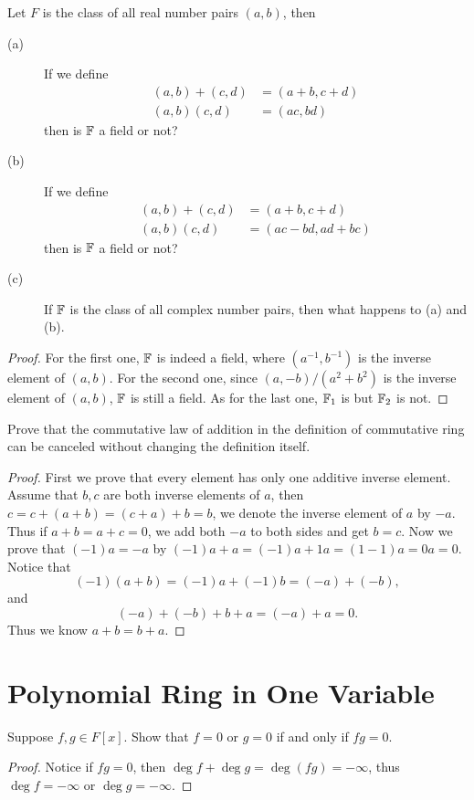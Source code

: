 \begin{pro}%
	Let $F$ is the class of all real number pairs $(a,b)$, then 
	\begin{description}
	\item[(a)] If we define 
		\begin{align*}
		(a,b)+(c,d)&=(a+b,c+d)\\
		(a,b)(c,d)&=(ac,bd)
		\end{align*}
		then is $\mathbb{F}$ a field or not?
	\item[(b)] If we define
		\begin{align*}
		(a,b)+(c,d)&=(a+b,c+d)\\
		(a,b)(c,d)&=(ac-bd,ad+bc)
		\end{align*}
		then is $\mathbb{F}$ a field or not?
	\item[(c)] If $\mathbb{F}$ is the class of all complex number pairs, then what happens to (a) and (b).
	\end{description}
\end{pro}
\begin{proof}
	For the first one, $\mathbb{F}$ is indeed a field, where $(a^{-1},b^{-1})$ is the inverse element of $(a,b)$. For the second one, since $(a,-b)/(a^2+b^2)$ is the inverse element of $(a,b)$, $\mathbb{F}$ is still a field. As for the last one, $\mathbb{F}_1$ is but $\mathbb{F}_2$ is not.
\end{proof}

\begin{pro}%
	Prove that the commutative law of addition in the definition of commutative ring can be canceled without changing the definition itself.
\end{pro}
\begin{proof}
	First we prove that every element has only one additive inverse element. Assume that $b,c$ are both inverse elements of $a$, then $c=c+(a+b)=(c+a)+b=b$, we denote the inverse element of $a$ by $-a$. Thus if $a+b=a+c=0$, we add both $-a$ to both sides and get $b=c$. Now we prove that $(-1)a=-a$ by $(-1)a+a=(-1)a+1a=(1-1)a=0a=0$. Notice that
	\[(-1)(a+b)=(-1)a+(-1)b=(-a)+(-b),\] and 
	\[(-a)+(-b)+b+a=(-a)+a=0.\]
	Thus we know $a+b=b+a$.
\end{proof}

\section{Polynomial Ring in One Variable}
\begin{pro}%
	Suppose $f,g\in F[x]$. Show that $f=0$ or $g=0$ if and only if $fg=0$.
\end{pro}
\begin{proof}
	Notice if $fg=0$, then $\deg f+\deg g=\deg(fg)=-\infty$, thus $\deg f=-\infty$ or $\deg g=-\infty$.
\end{proof}

